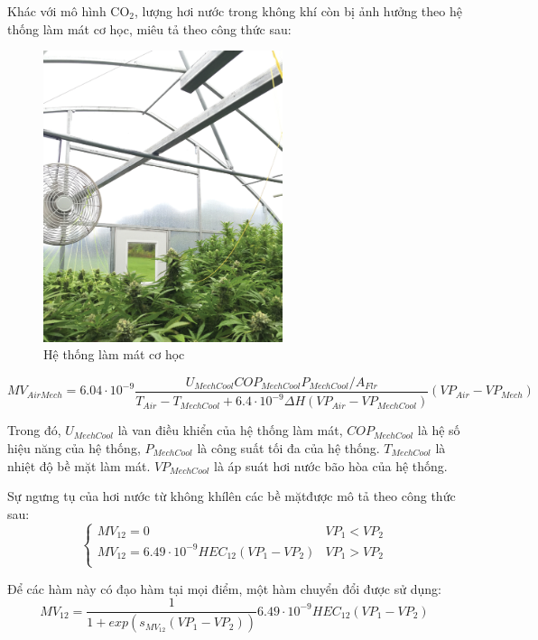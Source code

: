 \documentclass[a4paper]{article}
\begin{document}
Khác với mô hình $\mathrm{CO_2}$, lượng hơi nước trong không khí còn bị ảnh hưởng theo hệ thống làm mát cơ học, miêu tả theo công thức sau:
\begin{figure}[H]
	\begin{center}
		\includegraphics[width=7cm]{mech_coolt.png}
		\caption{Hệ thống làm mát cơ học}
		\label{fig:mech_cool}
	\end{center}
\end{figure}
 
\begin{equation}\label{MechAir}
MV_{AirMech} =  6.04 \cdot 10^{-9}\frac{U_{MechCool}COP_{MechCool}P_{MechCool}/A_{Flr}}{T_{Air}-T_{MechCool}+6.4 \cdot 10^{-9}\Delta H(VP_{Air}-VP_{MechCool})}(VP_{Air}-VP_{Mech})
\end{equation}
 	 

Trong đó, $U_{MechCool}$ là van điều khiển của hệ thống làm mát, $COP_{MechCool}$ là hệ số hiệu năng của hệ thống, $P_{MechCool}$ là công suất tối đa của hệ thống. $T_{MechCool}$ là nhiệt độ bề mặt làm mát. $VP_{MechCool}$ là áp suát hơi nước bão hòa của hệ thống.

Sự ngưng tụ của hơi nước từ không khílên các bề mặtđược mô tả theo công thức sau:
\begin{equation}
    \begin{cases}
            MV_{12}=0 & VP_1<VP_2 \\
            MV_{12}=6.49\cdot 10^{-9} HEC_{12}(VP_1-VP_2) &VP_1>VP_2\\
    \end{cases}
\end{equation}

Để các hàm này có đạo hàm tại mọi điểm, một hàm chuyển đổi được sử dụng:
\begin{equation}
    MV_{12}=\frac{1}{1+exp(s_{MV_{12}}(VP_1-VP_2))}6.49\cdot 10^{-9} HEC_{12}(VP_1-VP_2)
\end{equation}
\end{document}
